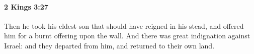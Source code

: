 
		\paragraph{2 Kings 3:27} %
			\label{2KINGS-3-27}

			Then he took his eldest son that should have reigned in his stead, and offered him for a burnt offering upon the wall. And there was great indignation against Israel: and they departed from him, and returned to their own land.

